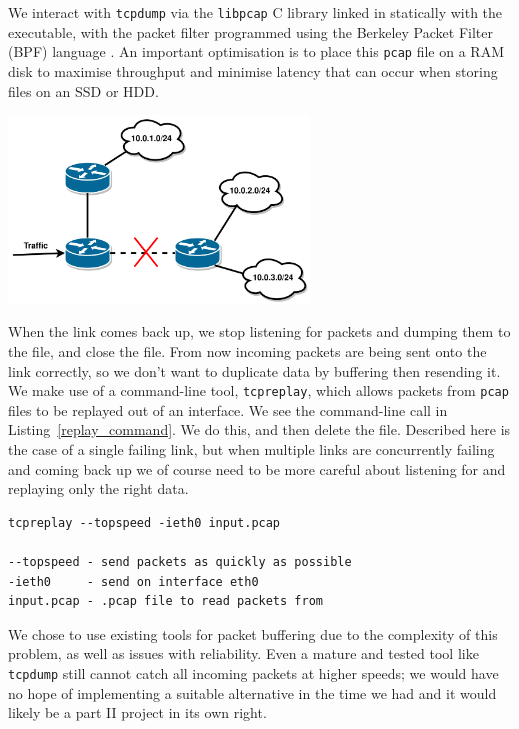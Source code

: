 \documentclass[withindex,glossary,openany]{cam-thesis}
\begin{document}
We interact with \texttt{tcpdump} via the \texttt{libpcap} C library linked in statically with the executable, with the packet filter programmed using the Berkeley Packet Filter (BPF) language \cite{STEVEN1993}. An important optimisation is to place this \texttt{pcap} file on a RAM disk to maximise throughput and minimise latency that can occur when storing files on an SSD or HDD.

\begin{center}
\begin{minipage}{0.9\textwidth} \centering
	\includegraphics[width=0.6\textwidth]{ip_route}
	\label{fig:ip_route}
\end{minipage}
\end{center}

When the link comes back up, we stop listening for packets and dumping them to the file, and close the file. From now incoming packets are being sent onto the link correctly, so we don't want to duplicate data by buffering then resending it. We make use of a command-line tool, \texttt{tcpreplay}, which allows packets from \texttt{pcap} files to be replayed out of  an interface. We see the command-line call in Listing~\ref{replay_command}. We do this, and then delete the file. Described here is the case of a single failing link, but when multiple links are concurrently failing and coming back up we of course need to be more careful about listening for and replaying only the right data.

\begin{lstlisting}[label=replay_command, caption=\texttt{tcpreplay} command with explanation of arguments, frame=tb]
tcpreplay --topspeed -ieth0 input.pcap

--topspeed - send packets as quickly as possible
-ieth0     - send on interface eth0
input.pcap - .pcap file to read packets from
\end{lstlisting}

We chose to use existing tools for packet buffering due to the complexity of this problem, as well as issues with reliability. Even a mature and tested tool like \texttt{tcpdump} still cannot catch all incoming packets at higher speeds; we would have no hope of implementing a suitable alternative in the time we had and it would likely be a part II project in its own right.
\end{document}
